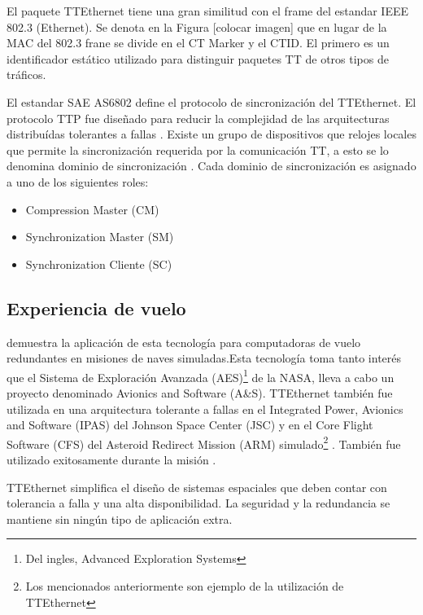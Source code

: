El paquete TTEthernet tiene una gran similitud con el frame del estandar IEEE 802.3 (Ethernet). Se denota en la Figura [colocar imagen] que en lugar de la MAC del 802.3 frane se divide en el CT Marker y el CTID. El primero es un identificador estático utilizado para distinguir paquetes \ac{TT} de otros tipos de tráficos.


El estandar SAE AS6802 define el protocolo de sincronización del TTEthernet. El protocolo TTP fue diseñado para reducir la complejidad de las arquitecturas distribuídas tolerantes a fallas \citep{TTTechWeb}. Existe un grupo de dispositivos que relojes locales que permite la sincronización requerida por la comunicación \ac{TT}, a esto se lo denomina dominio de sincronización \citep{Loveless15}. Cada dominio de sincronización es asignado a uno de los siguientes roles:
\begin{itemize}
	\item Compression Master (CM)
	\item Synchronization Master (SM)
	\item Synchronization Cliente (SC)
\end{itemize}

\subsection{Experiencia de vuelo}
\cite{Loveless15} demuestra la aplicación de esta tecnología para computadoras de vuelo redundantes en misiones de naves simuladas.Esta tecnología toma tanto interés que el Sistema de Exploración Avanzada (AES)\footnote{Del ingles, Advanced Exploration Systems} de la \ac{NASA}, lleva a cabo un proyecto denominado Avionics and Software (A&S). TTEthernet también fue utilizada en una arquitectura tolerante a fallas en el Integrated Power, Avionics and Software (IPAS)  del Johnson Space Center (JSC) y en el Core Flight Software (CFS) del Asteroid Redirect Mission (ARM) simulado\footnote{Los mencionados anteriormente son ejemplo de la utilización de TTEthernet} \citep{Loveless15}. También fue utilizado exitosamente durante la misión \citep{TTTechOrion} .

TTEthernet simplifica el diseño de sistemas espaciales que deben contar con tolerancia a falla y una alta disponibilidad. La seguridad y la redundancia se mantiene sin ningún tipo de aplicación extra.
